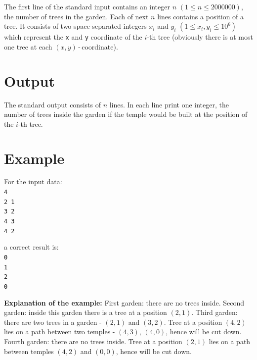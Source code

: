 \documentclass[10pt]{article}
\begin{document}
    The first line of the standard input contains an integer $n$ $(1\leq n\leq 2000000)$, the number of trees in the garden. Each of next $n$ lines contains a position of a tree. It consists of two space-separated integers $x_{i}$ and $y_{i}$ $(1\leq x_{i}, y_{i}\leq 10^{6})$ which represent the \texttt{x} and \texttt{y} coordinate of the $i$-th tree (obviously there is at most one tree at each $(x, y)$\,-\,coordinate).


    \section*{Output}
    
    The standard output consists of $n$ lines. In each line print one integer, the number of trees inside the garden if the temple would be built at the position of the $i$-th tree.
    

    \section*{Example}
    
    \noindent
    \begin{minipage}[t]{0.5\textwidth}
        For the input data:\vspace{1ex}\\
        \texttt{4\\2 1\\3 2\\4 3\\4 2}
    \end{minipage}
    \begin{minipage}[t]{0.5\textwidth}
        a correct result is:\vspace{1ex}\\
        \texttt{0\\1\\2\\0}
    \end{minipage}
    
    \vspace{2ex}
    \noindent\textbf{Explanation of the example:} First garden: there are no trees inside. Second garden: inside this garden there is a tree at a position $(2, 1)$. Third garden: there are two trees in a garden - $(2, 1)$ and $(3, 2)$. Tree at a position $(4, 2)$ lies on a path between two temples - $(4, 3)$, $(4, 0)$, hence will be cut down. Fourth garden: there are no trees inside. Tree at a position $(2, 1)$ lies on a path between temples $(4, 2)$ and $(0, 0)$, hence will be cut down.
    
\end{document}
